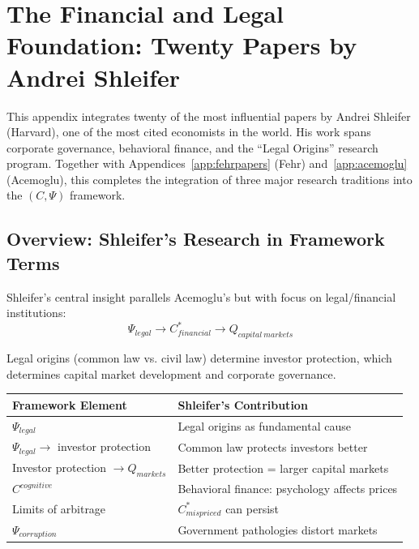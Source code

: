 \section{The Financial and Legal Foundation: Twenty Papers by Andrei Shleifer}
\label{app:shleifer}

This appendix integrates twenty of the most influential papers by Andrei Shleifer
(Harvard), one of the most cited economists in the world. His work spans
corporate governance, behavioral finance, and the ``Legal Origins'' research
program. Together with Appendices~\ref{app:fehrpapers} (Fehr) and~\ref{app:acemoglu}
(Acemoglu), this completes the integration of three major research traditions
into the $(C, \Psi)$ framework.

\subsection{Overview: Shleifer's Research in Framework Terms}

Shleifer's central insight parallels Acemoglu's but with focus on legal/financial
institutions:
\begin{equation}
  \Psi_{legal} \to C^*_{financial} \to Q_{capital\ markets}
\end{equation}

Legal origins (common law vs. civil law) determine investor protection,
which determines capital market development and corporate governance.

\begin{center}
\renewcommand{\arraystretch}{1.2}
\small
\begin{tabular}{ll}
\hline
\textbf{Framework Element} & \textbf{Shleifer's Contribution} \\
\hline
$\Psi_{legal}$ & Legal origins as fundamental cause \\
$\Psi_{legal} \to$ investor protection & Common law protects investors better \\
Investor protection $\to Q_{markets}$ & Better protection = larger capital markets \\
$C^{cognitive}$ & Behavioral finance: psychology affects prices \\
Limits of arbitrage & $C^*_{mispriced}$ can persist \\
$\Psi_{corruption}$ & Government pathologies distort markets \\
\hline
\end{tabular}
\end{center}

